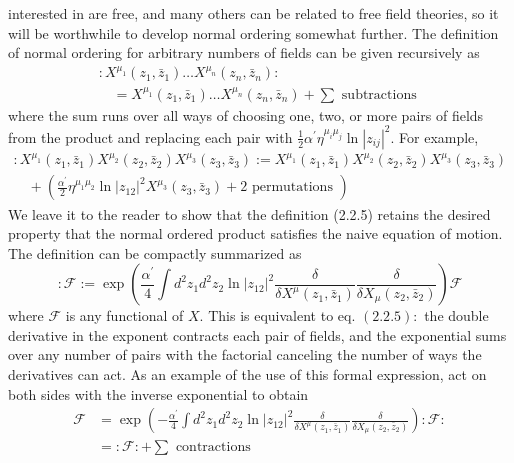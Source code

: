 interested in are free, and many others can be related to free field theories,
so it will be worthwhile to develop normal ordering somewhat further.
The definition of normal ordering for arbitrary numbers of fields can
be given recursively as
\begin{equation}
\begin{array}{l}
: X^{\mu_{1}}\left(z_{1}, \bar{z}_{1}\right) \ldots X^{\mu_{n}}\left(z_{n}, \bar{z}_{n}\right): \\
\quad=X^{\mu_{1}}\left(z_{1}, \bar{z}_{1}\right) \ldots X^{\mu_{n}}\left(z_{n}, \bar{z}_{n}\right)+\sum \text { subtractions }
\end{array}
\end{equation}
where the sum runs over all ways of choosing one, two, or more pairs of fields from the product and replacing each pair with $\frac{1}{2} \alpha^{\prime} \eta^{\mu_{i} \mu_{j}} \ln \left|z_{i j}\right|^{2}$. For example,\begin{equation}
\begin{array}{l}
: X^{\mu_{1}}\left(z_{1}, \bar{z}_{1}\right) X^{\mu_{2}}\left(z_{2}, \bar{z}_{2}\right) X^{\mu_{3}}\left(z_{3}, \bar{z}_{3}\right):=X^{\mu_{1}}\left(z_{1}, \bar{z}_{1}\right) X^{\mu_{2}}\left(z_{2}, \bar{z}_{2}\right) X^{\mu_{3}}\left(z_{3}, \bar{z}_{3}\right) \\
\quad+\left(\frac{\alpha^{\prime}}{2} \eta^{\mu_{1} \mu_{2}} \ln \left|z_{12}\right|^{2} X^{\mu_{3}}\left(z_{3}, \bar{z}_{3}\right)+2 \text { permutations }\right)
\end{array}
\end{equation}
We leave it to the reader to show that the definition (2.2.5) retains the desired property that the normal ordered product satisfies the naive equation
of motion.
The definition can be compactly summarized as
\begin{equation}
: \mathscr{F}:=\exp \left(\frac{\alpha^{\prime}}{4} \int d^{2} z_{1} d^{2} z_{2} \ln \left|z_{12}\right|^{2} \frac{\delta}{\delta X^{\mu}\left(z_{1}, \bar{z}_{1}\right)} \frac{\delta}{\delta X_{\mu}\left(z_{2}, \bar{z}_{2}\right)}\right) \mathscr{F}
\end{equation}
where $\mathscr{F}$ is any functional of $X .$ This is equivalent to eq. $(2.2 .5):$ the double derivative in the exponent contracts each pair of fields, and the exponential sums over any number of pairs with the factorial canceling the number of ways the derivatives can act. As an example of the use of this formal expression, act on both sides with the inverse exponential to obtain
\begin{equation}
\begin{aligned}
\mathscr{F} &=\exp \left(-\frac{\alpha^{\prime}}{4} \int d^{2} z_{1} d^{2} z_{2} \ln \left|z_{12}\right|^{2} \frac{\delta}{\delta X^{\mu}\left(z_{1}, \bar{z}_{1}\right)} \frac{\delta}{\delta X_{\mu}\left(z_{2}, \bar{z}_{2}\right)}\right): \mathscr{F}: \\
&=: \mathscr{F}:+\sum \text { contractions }
\end{aligned}
\end{equation}
